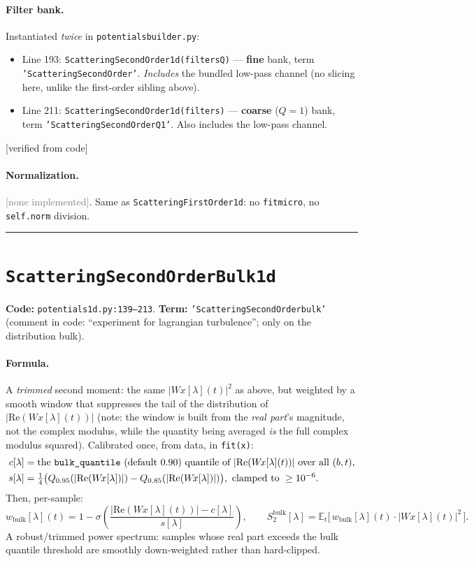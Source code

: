 \documentclass[11pt]{article}
\newcommand{\E}{\mathbb{E}}
\newcommand{\Wx}{W\!x}
\newcommand{\code}[1]{\texttt{#1}}
\renewcommand{\_}{\origunderscore\allowbreak} %
\newcommand{\verified}{\textcolor{blue!50!black}{[verified from code]}}
\newcommand{\none}{\textcolor{gray}{[none implemented]}}
\begin{document}
\paragraph{Filter bank.} Instantiated \emph{twice} in \code{potentials\_builder.py}:
\begin{itemize}
  \item Line 193: \code{Scattering\_Second\_Order\_1d(filters\_Q)} — \textbf{fine}
        bank, term \code{'Scattering\_Second\_Order'}. \emph{Includes} the bundled
        low-pass channel (no slicing here, unlike the first-order sibling above).
  \item Line 211: \code{Scattering\_Second\_Order\_1d(filters)} — \textbf{coarse}
        ($Q=1$) bank, term \code{'Scattering\_Second\_Order\_Q1'}. Also includes
        the low-pass channel.
\end{itemize}
\verified

\paragraph{Normalization.} \none. Same as \code{Scattering\_First\_Order\_1d}:
no \code{fit\_micro}, no \code{self.norm} division.

\bigskip
\hrule
\bigskip

\section{\code{Scattering\_Second\_Order\_Bulk\_1d}}
\textbf{Code:} \code{potentials\_1d.py:139--213}. \quad
\textbf{Term:} \code{'Scattering\_Second\_Order\_bulk'} (comment in code:
``experiment for lagrangian turbulence''; only on the distribution bulk).

\paragraph{Formula.} A \emph{trimmed} second moment: the same $|\Wx[\lambda](t)|^2$
as above, but weighted by a smooth window that suppresses the tail of the
distribution of $|\mathrm{Re}(\Wx[\lambda](t))|$ (note: the window is built from
the \emph{real part}'s magnitude, not the complex modulus, while the quantity
being averaged \emph{is} the full complex modulus squared). Calibrated once, from
data, in \code{fit(x)}:
\begin{align}
  c[\lambda] &= \text{the \code{bulk\_quantile} (default 0.90) quantile of } |\mathrm{Re}(\Wx[\lambda](t))| \text{ over all } (b,t),\\
  s[\lambda] &= \tfrac{1}{4}\big(Q_{0.95}(|\mathrm{Re}(\Wx[\lambda])|) - Q_{0.85}(|\mathrm{Re}(\Wx[\lambda])|)\big), \text{ clamped to } \ge 10^{-6}.
\end{align}
Then, per-sample:
\begin{equation}
  w_{\text{bulk}}[\lambda](t) = 1 - \sigma\!\left(\frac{|\mathrm{Re}(\Wx[\lambda](t))| - c[\lambda]}{s[\lambda]}\right), \qquad
  S_2^{\text{bulk}}[\lambda] = \E_t\big[\,w_{\text{bulk}}[\lambda](t)\cdot|\Wx[\lambda](t)|^2\,\big].
\end{equation}
A robust/trimmed power spectrum: samples whose real part exceeds the bulk
quantile threshold are smoothly down-weighted rather than hard-clipped.
\end{document}
